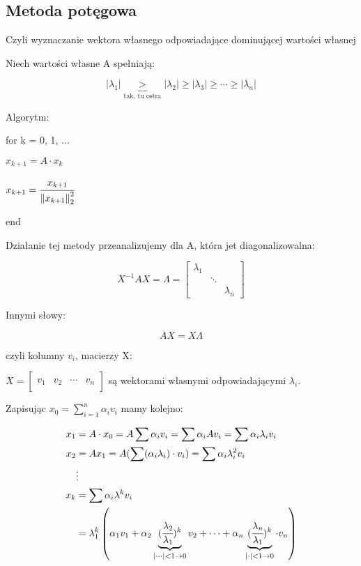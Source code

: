 \documentclass[hidelinks,a4paper]{article}
\newcommand{\ra}{\rightarrow}
\newcommand{\norm}[1]{\left\lVert#1\right\rVert}
\begin{document}
\subsection{Metoda potęgowa}
Czyli wyznaczanie wektora własnego odpowiadające dominującej wartości własnej

Niech wartości własne A spełniają:

\[
	|\lambda_1| \underbrace{>}_{\textrm{tak, tu ostra}} |\lambda_2| \geq |\lambda_3| \geq \cdots \geq |\lambda_n|
\]

Algorytm:

for k = 0, 1, ...
 
$x_{k+1} = A \cdot x_k$

$x_{k+1} = \cfrac{x_{k+1}}{\norm{x_{k+1}}_2^2}$

end
 
Działanie tej metody przeanalizujemy dla A, która jet diagonalizowalna:
 
\[
	X^{-1} A X = \Lambda = \begin{bmatrix} \lambda_1 &  & \\  &  \ddots & \\ &  & \lambda_n \end{bmatrix}
\]
 
Innymi słowy:
 
\[
	AX = X \Lambda
\]
 
czyli kolumny $v_i$, macierzy X:
 
$X = \left[ \begin{array}{c|c|c|c} &&& \\ v_1 & v_2 & \cdots & v_n \\ &&& \end{array} \right]$ są wektorami własnymi odpowiadającymi $\lambda_i$.
 
Zapisując $x_0 = \sum_{i=1}^{n} \alpha_i v_i$ mamy kolejno:
 
\begin{align*}
	x_1 & = A \cdot x_0 = A \sum \alpha_iv_i = \sum \alpha_i Av_i = \sum \alpha_i \lambda_i v_i \\
	x_2 & = Ax_1 = A(\sum(\alpha_i\lambda_i)\cdot v_i) = \sum \alpha_i \lambda_i^2 v_i \\
	& \vdots \\
	x_k & = \sum \alpha_i \lambda^k v_i \\ & = \lambda_1^k\left(\alpha_1 v_1 + \alpha_2\underbrace{(\cfrac{\lambda_2}{\lambda_1})^k}_{| \cdots | < 1 \ra 0} v_2 + \cdots + \alpha_n \underbrace{(\cfrac{\lambda_n}{\lambda_1})^k}_{| \cdot | < 1 \ra 0} \cdot v_n\right)
\end{align*}
 
\end{document}
